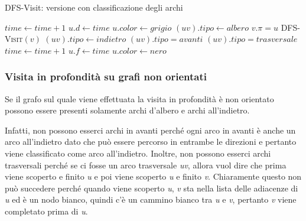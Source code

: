 \begin{breakablealgorithm}
	\caption{DFS-Visit: versione con classificazione degli archi}
	\begin{algorithmic}[1]
			\State $ time \gets time + 1 $
			\State $ u.d \gets time $
			\State $ u.color \gets grigio $
					\State $(uv).tipo \gets albero$ 
					\State $ v.\pi = u $
					\State \textsc{DFS-Visit}$ (v) $  
				\EndIf
					\State $(uv).tipo \gets indietro$ 
				\EndIf
						\State $ (uv).tipo = avanti  $ 
					\EndIf
					\State $ (uv).tipo = trasversale  $  
					\EndIf
				\EndIf
			\EndFor
			\State $ time \gets time + 1 $
			\State $ u.f \gets time $
			\State $ u.color \gets nero $
		\EndFunction
	\end{algorithmic}
\end{breakablealgorithm}

\subsubsection{Visita in profondità su grafi non orientati}\label{visita-in-profondituxe0-su-grafi-orientati}

Se il grafo sul quale viene effettuata la visita in profondità è non
orientato possono essere presenti solamente archi d'albero e archi
all'indietro.

Infatti, non possono esserci archi in avanti perché ogni arco in avanti è anche un arco all'indietro dato che può essere percorso in entrambe le direzioni e pertanto viene classificato come arco all'indietro.
Inoltre, non possono esserci archi trasversali perché se ci fosse un arco trasversale \textit{uv}, allora vuol dire che prima viene scoperto e finito \textit{u} e poi viene scoperto \textit{u} e finito \textit{v}. Chiaramente questo non può succedere perché quando viene scoperto \textit{u}, \textit{v} sta nella lista delle adiacenze di \textit{u} ed è un nodo bianco, quindi c'è un cammino bianco tra \textit{u} e \textit{v}, pertanto \textit{v} viene completato prima di \textit{u}.

